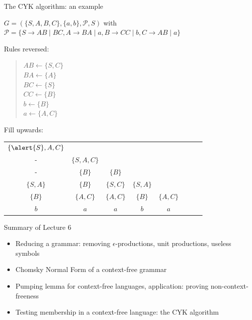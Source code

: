 \documentclass[handout]{beamer}
\begin{document}
\begin{frame}{The CYK algorithm: an example}

	\begin{example}
	$G=(\{S,A,B,C\},\{a,b\},\mathcal P,S)$ with $\mathcal P=\{S\to AB\mid BC, A\to BA\mid a, B\to CC\mid b, C\to AB\mid a\}$
	\end{example}
	\vspace{-6pt}
	Rules reversed:\vspace{-6pt}
	\begin{quote}
		\begin{multicols}{4}\small
			$AB  \leftarrow  \{S,C\}$\\
			$BA  \leftarrow  \{A\}$\\
			$BC  \leftarrow  \{S\}$\\
			$CC  \leftarrow  \{B\}$\\
			$b   \leftarrow  \{B\}$\\
			$a   \leftarrow  \{A,C\}$
		\end{multicols}	
	\end{quote}

	\vspace{-12pt}
	Fill upwards:
	\vspace{3pt}

	\begin{center}
		\begin{tabular}{|c c c c c c c c}
			$\{\alert{S},A,C\}$ \\ 
			- &  $\{S,A,C\}$  \\ 
			- &  $\{B\}$ &  $\{B\}$ \\ 
			$\{S,A\}$ &  $\{B\}$ & $\{S,C\}$ &  $\{S,A\}$ \\ 
			$\{B\}$ & $\{A,C\}$ &  $\{A,C\}$ &$\{B\}$ &$\{A,C\}$ \\ %
			\rowcolor{Gray}$b$&$a$&$a$&$b$&$a$
		\end{tabular}
	\end{center}
\end{frame}


\begin{frame}{Summary of Lecture 6}
	
	\begin{itemize}
		\item Reducing a grammar: removing $\epsilon$-productions, unit productions, useless symbols
		\item Chomsky Normal Form of a context-free grammar
		\item Pumping lemma for context-free languages, application: proving non-context-freeness
		\item Testing membership in a context-free language: the CYK algorithm
	\end{itemize}

\end{frame}
\end{document}
